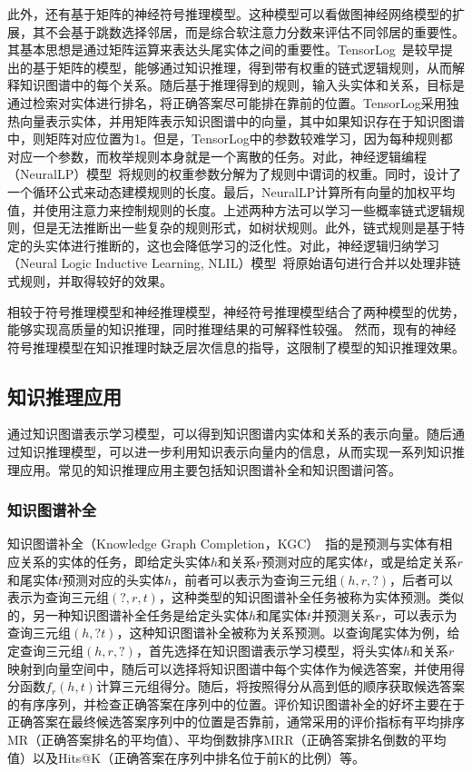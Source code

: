 \documentclass[algorithmlist, AutoFakeBold, AutoFakeSlant, figurelist, tablelist, nomlist, engineering, openany]{seuthesix} %
\begin{document}
此外，还有基于矩阵的神经符号推理模型。这种模型可以看做图神经网络模型的扩展，其不会基于跳数选择邻居，而是综合软注意力分数来评估不同邻居的重要性。其基本思想是通过矩阵运算来表达头尾实体之间的重要性。TensorLog~\cite{cohen2016tensorlog}是较早提出的基于矩阵的模型，能够通过知识推理，得到带有权重的链式逻辑规则，从而解释知识图谱中的每个关系。随后基于推理得到的规则，输入头实体和关系，目标是通过检索对实体进行排名，将正确答案尽可能排在靠前的位置。TensorLog采用独热向量表示实体，并用矩阵表示知识图谱中的向量，其中如果知识存在于知识图谱中，则矩阵对应位置为1。但是，TensorLog中的参数较难学习，因为每种规则都对应一个参数，而枚举规则本身就是一个离散的任务。对此，神经逻辑编程（NeuralLP）模型~\cite{yang2017differentiable}将规则的权重参数分解为了规则中谓词的权重。同时，设计了一个循环公式来动态建模规则的长度。最后，NeuralLP计算所有向量的加权平均值，并使用注意力来控制规则的长度。上述两种方法可以学习一些概率链式逻辑规则，但是无法推断出一些复杂的规则形式，如树状规则。此外，链式规则是基于特定的头实体进行推断的，这也会降低学习的泛化性。对此，神经逻辑归纳学习（Neural Logic Inductive Learning, NLIL）模型~\cite{yang2019learn}将原始语句进行合并以处理非链式规则，并取得较好的效果。

相较于符号推理模型和神经推理模型，神经符号推理模型结合了两种模型的优势，能够实现高质量的知识推理，同时推理结果的可解释性较强。
然而，现有的神经符号推理模型在知识推理时缺乏层次信息的指导，这限制了模型的知识推理效果。

\subsection{知识推理应用}
通过知识图谱表示学习模型，可以得到知识图谱内实体和关系的表示向量。随后通过知识推理模型，可以进一步利用知识表示向量内的信息，从而实现一系列知识推理应用。常见的知识推理应用主要包括知识图谱补全和知识图谱问答。

\subsubsection{知识图谱补全}
知识图谱补全（Knowledge Graph Completion，KGC）~\cite{vu2019capsule}指的是预测与实体有相应关系的实体的任务，即给定头实体$h$和关系$r$预测对应的尾实体$t$，或是给定关系$r$和尾实体$t$预测对应的头实体$h$，前者可以表示为查询三元组$\left(h, r, ?\right)$，后者可以表示为查询三元组$\left(?, r, t\right)$，这种类型的知识图谱补全任务被称为实体预测。类似的，另一种知识图谱补全任务是给定头实体$h$和尾实体$t$并预测关系$r$，可以表示为查询三元组$\left(h, ? t\right)$，这种知识图谱补全被称为关系预测。以查询尾实体为例，给定查询三元组$\left(h, r, ?\right)$，首先选择在知识图谱表示学习模型，将头实体$h$和关系$r$映射到向量空间中，随后可以选择将知识图谱中每个实体作为候选答案，并使用得分函数$f_r\left(h, t\right)$计算三元组得分。随后，将按照得分从高到低的顺序获取候选答案的有序序列，并检查正确答案在序列中的位置。评价知识图谱补全的好坏主要在于正确答案在最终候选答案序列中的位置是否靠前，通常采用的评价指标有平均排序MR（正确答案排名的平均值）、平均倒数排序MRR（正确答案排名倒数的平均值）以及Hits@K（正确答案在序列中排名位于前K的比例）等。
\end{document}
